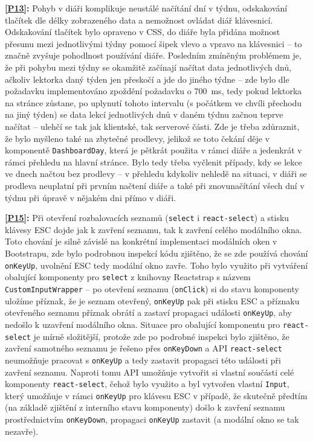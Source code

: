 \textbf{\ref{P13}:} Pohyb v diáři komplikuje neustálé načítání dní v týdnu, odskakování tlačítek dle délky zobrazeného data a nemožnost ovládat diář klávesnicí. Odskakování tlačítek bylo opraveno v CSS, do diáře byla přidána možnost přesunu mezi jednotlivými týdny pomocí šipek vlevo a vpravo na klávesnici -- to značně zvyšuje pohodlnost používání diáře. Posledním zmíněným problémem je, že při pohybu mezi týdny se okamžitě začínají načítat data jednotlivých dnů, ačkoliv lektorka daný týden jen přeskočí a jde do jiného týdne -- zde bylo dle požadavku implementováno zpoždění požadavku o 700~ms, tedy pokud lektorka na stránce zůstane, po uplynutí tohoto intervalu (s počátkem ve chvíli přechodu na jiný týden) se data lekcí jednotlivých dnů v daném týdnu začnou teprve načítat -- ulehčí se tak jak klientské, tak serverové části. Zde je třeba zdůraznit, že bylo myšleno také na zbytečné prodlevy, jelikož se toto čekání děje v komponentě \verb|DashboardDay|, která je pětkrát použita v rámci diáře a jedenkrát v rámci přehledu na hlavní stránce. Bylo tedy třeba vyčlenit případy, kdy se lekce ve dnech načtou bez prodlevy -- v přehledu kdykoliv nehledě na situaci, v diáři se prodleva neuplatní při prvním načtení diáře a také při znovunačítání všech dní v týdnu při úpravě v nějakém dni přímo v diáři.

\textbf{\ref{P15}:} Při otevření rozbalovacích seznamů (\verb|select| i \verb|react-select|) a stisku klávesy ESC dojde jak k zavření seznamu, tak k zavření celého modálního okna. Toto chování je silně závislé na konkrétní implementaci modálních oken v Bootstrapu, zde bylo podrobnou inspekcí kódu zjištěno, že se zde používá chování \verb|onKeyUp|, uvolnění ESC tedy modální okno zavře. Toho bylo využito při vytváření obalující komponenty pro \verb|select| z knihovny Reactstrap s názvem \verb|CustomInputWrapper| -- po otevření seznamu (\verb|onClick|) si do stavu komponenty uložíme příznak, že je seznam otevřený, \verb|onKeyUp| pak při stisku ESC a příznaku otevřeného seznamu příznak obrátí a zastaví propagaci události \verb|onKeyUp|, aby nedošlo k uzavření modálního okna. Situace pro obalující komponentu pro \verb|react-select| je mírně složitější, protože zde po podrobné inspekci bylo zjištěno, že zavření samotného seznamu je řešeno přes \verb|onKeyDown| a API \verb|react-select| neumožňuje pracovat s \verb|onKeyUp| a tedy zastavit propagaci této události při zavření seznamu. Naproti tomu API umožňuje vytvořit si vlastní součásti celé komponenty \verb|react-select|, čehož bylo využito a byl vytvořen vlastní \verb|Input|, který umožňuje v rámci \verb|onKeyUp| pro klávesu ESC v případě, že skutečně předtím (na základě zjištění z interního stavu komponenty) došlo k zavření seznamu prostřednictvím \verb|onKeyDown|, propagaci \verb|onKeyUp| zastavit (a modální okno se tak nezavře).

